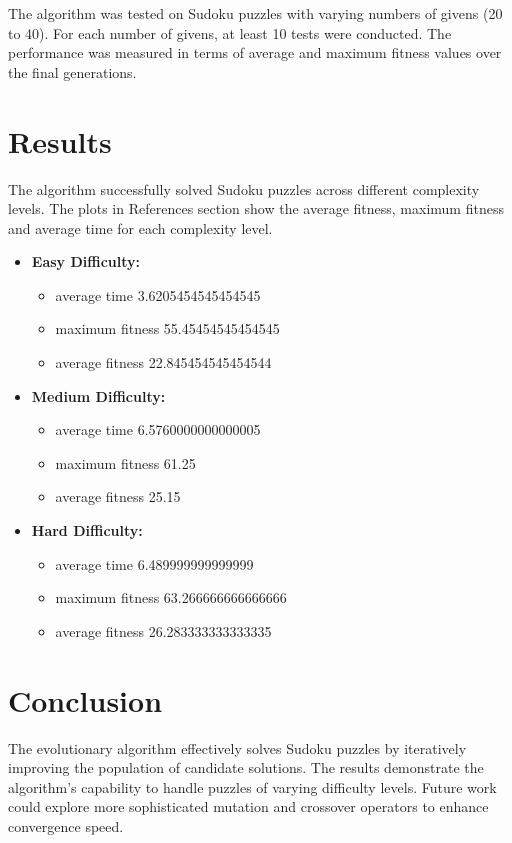 \documentclass{article}
\begin{document}
The algorithm was tested on Sudoku puzzles with varying numbers of givens (20 to 40). For each number of givens, at least 10 tests were conducted. The performance was measured in terms of average and maximum fitness values over the final generations.

\section{Results}

The algorithm successfully solved Sudoku puzzles across different complexity levels. The plots in References section
show the average fitness, maximum fitness and average time for each complexity level. 

\begin{itemize}
    \item \textbf{Easy Difficulty:}  
      \begin{itemize}
        \item average time 3.6205454545454545
        \item maximum fitness 55.45454545454545
        \item average fitness 22.845454545454544
      \end{itemize}
  \item \textbf{Medium Difficulty:}  
    \begin{itemize}
      \item average time 6.5760000000000005
      \item maximum fitness 61.25
      \item average fitness 25.15
    \end{itemize}
  \item \textbf{Hard Difficulty:}
    \begin{itemize}
      \item average time 6.489999999999999
      \item maximum fitness 63.266666666666666
      \item average fitness 26.283333333333335
    \end{itemize}
\end{itemize}

\section{Conclusion}

The evolutionary algorithm effectively solves Sudoku puzzles by iteratively improving the population of candidate solutions. The results demonstrate the algorithm's capability to handle puzzles of varying difficulty levels. Future work could explore more sophisticated mutation and crossover operators to enhance convergence speed.
\end{document}
